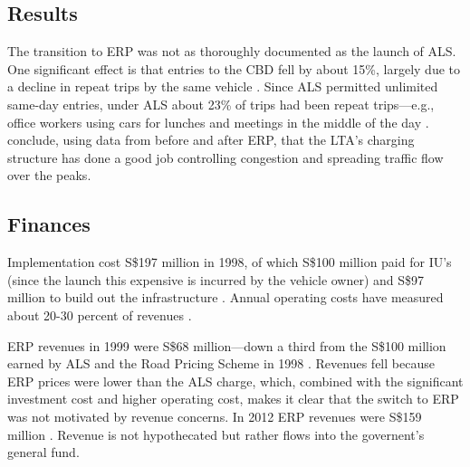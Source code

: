 \subsection{Results}

The transition to ERP was not as thoroughly documented as the launch of ALS. One significant effect is that entries to the CBD fell by about 15\%, largely due to a decline in repeat trips by the same vehicle \citep{Menon2000}. Since ALS permitted unlimited same-day entries, under ALS about 23\% of trips had been repeat trips---e.g., office workers using cars for lunches and meetings in the middle of the day \citep[p. 23]{Chin2009}. \citet{Olszewski2005} conclude, using data from before and after ERP, that the LTA's charging structure has done a good job controlling congestion and spreading traffic flow over the peaks.

\subsection{Finances}

Implementation cost S\$197 million in 1998, of which S\$100 million paid for IU's (since the launch this expensive is incurred by the vehicle owner) and S\$97 million to build out the infrastructure \citep{Santos2004}. Annual operating costs have measured about 20-30 percent of revenues \citep{Chin2009}.

ERP revenues in 1999 were S\$68 million---down a third from the S\$100 million earned by ALS and the Road Pricing Scheme in 1998 \cite[p. 34]{Goh2002}. Revenues fell because ERP prices were lower than the ALS charge, which, combined with the significant investment cost and higher operating cost, makes it clear that the switch to ERP was not motivated by revenue concerns. In 2012 ERP revenues were S\$159 million \citep{Chen2012}. Revenue is not hypothecated but rather flows into the governent's general fund.

